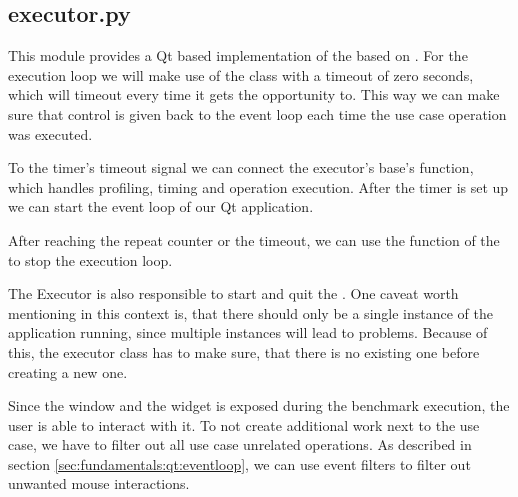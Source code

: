 \subsection{executor.py}

This module provides a Qt based implementation of the
 based on
. For the execution loop we will make use of
the  class with a timeout of zero seconds,
which will timeout every time it gets the opportunity to. This way we can make
sure that control is given back to the event loop each time the use case
operation was executed.
\cite{QTimer}

To the timer's timeout signal we can connect the executor's base's
 function, which handles profiling, timing
and operation execution. After the timer is set up we can start the event loop
of our Qt application.



After reaching the repeat counter or the timeout, we can use the
 function of the 
to stop the execution loop.



The Executor is also responsible to start and quit the
. One caveat worth mentioning in this
context is, that there should only be a single instance of the application
running, since multiple  instances will lead to
problems. Because of this, the executor class has to make sure, that there is
no existing one before creating a new one.



Since the window and the widget is exposed during the benchmark execution, the
user is able to interact with it. To not create additional work next to the use
case, we have to filter out all use case unrelated operations. As described in
section \ref{sec:fundamentals:qt:eventloop}, we can use event filters to filter
out unwanted mouse interactions.




